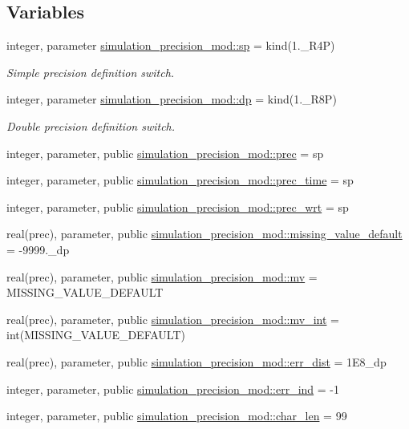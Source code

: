 \subsection*{Variables}
\begin{DoxyCompactItemize}
\item 
integer, parameter \hyperlink{namespacesimulation__precision__mod_a15b1ab993f9b11430e9d9d3dc6c77614}{simulation\+\_\+precision\+\_\+mod\+::sp} = kind(1.\+\_\+\+R4P)
\begin{DoxyCompactList}\small\item\em Simple precision definition switch. \end{DoxyCompactList}\item 
integer, parameter \hyperlink{namespacesimulation__precision__mod_a4d49b0033a5e2bc6693c5b2dfb63a032}{simulation\+\_\+precision\+\_\+mod\+::dp} = kind(1.\+\_\+\+R8P)
\begin{DoxyCompactList}\small\item\em Double precision definition switch. \end{DoxyCompactList}\item 
integer, parameter, public \hyperlink{namespacesimulation__precision__mod_aaff1ddf996761a1e11e787d63e1612f6}{simulation\+\_\+precision\+\_\+mod\+::prec} = sp
\item 
integer, parameter, public \hyperlink{namespacesimulation__precision__mod_a3833ad1bc52c3738ac861591b7492737}{simulation\+\_\+precision\+\_\+mod\+::prec\+\_\+time} = sp
\item 
integer, parameter, public \hyperlink{namespacesimulation__precision__mod_ad515822198607dfee68a6ed8b246c7da}{simulation\+\_\+precision\+\_\+mod\+::prec\+\_\+wrt} = sp
\item 
real(prec), parameter, public \hyperlink{namespacesimulation__precision__mod_a1fb0f91226452bb43d4c61cae32a9a6d}{simulation\+\_\+precision\+\_\+mod\+::missing\+\_\+value\+\_\+default} = -\/9999.\+\_\+dp
\item 
real(prec), parameter, public \hyperlink{namespacesimulation__precision__mod_a39845d8a0d331a7b9225feb5fe19ba3b}{simulation\+\_\+precision\+\_\+mod\+::mv} = M\+I\+S\+S\+I\+N\+G\+\_\+\+V\+A\+L\+U\+E\+\_\+\+D\+E\+F\+A\+U\+LT
\item 
real(prec), parameter, public \hyperlink{namespacesimulation__precision__mod_abcad51274c804cb573d8f5720c5dfa05}{simulation\+\_\+precision\+\_\+mod\+::mv\+\_\+int} = int(M\+I\+S\+S\+I\+N\+G\+\_\+\+V\+A\+L\+U\+E\+\_\+\+D\+E\+F\+A\+U\+LT)
\item 
real(prec), parameter, public \hyperlink{namespacesimulation__precision__mod_ae3222dd2d51f6b7221be1ca1c70e3e6c}{simulation\+\_\+precision\+\_\+mod\+::err\+\_\+dist} = 1\+E8\+\_\+dp
\item 
integer, parameter, public \hyperlink{namespacesimulation__precision__mod_a82a4b689dc26018c961193b991c489d4}{simulation\+\_\+precision\+\_\+mod\+::err\+\_\+ind} = -\/1
\item 
integer, parameter, public \hyperlink{namespacesimulation__precision__mod_a8a3305091ff953708508525398aa7129}{simulation\+\_\+precision\+\_\+mod\+::char\+\_\+len} = 99
\end{DoxyCompactItemize}
